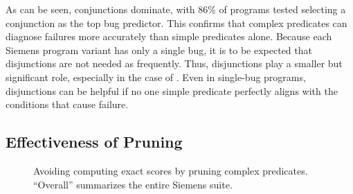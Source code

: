 As can be seen, conjunctions dominate, with 86\% of programs tested selecting a conjunction as the top bug predictor.  This confirms that complex predicates can diagnose failures more accurately than simple predicates alone.  Because each Siemens program variant has only a single bug, it is to be expected that disjunctions are not needed as frequently.  Thus, disjunctions play a smaller but significant role, especially in the case of .  Even in single-bug programs, disjunctions can be helpful if no one simple predicate perfectly aligns with the conditions that cause failure.

\subsection{Effectiveness of Pruning}
\label{sec-effectprune}

\begin{figure*}[tb]
  \centering
  \hfill
  \caption{Avoiding computing exact scores by pruning complex predicates.  ``Overall'' summarizes the entire Siemens suite.}
  \label{fig-pruning}
\end{figure*}

